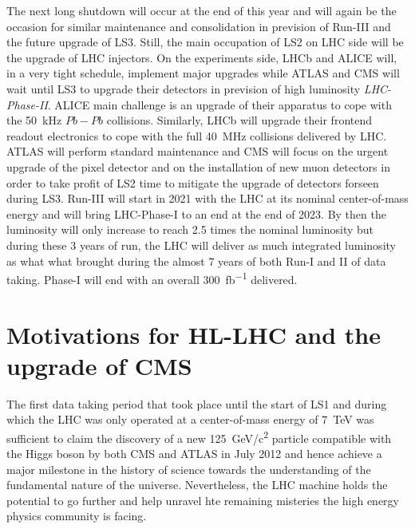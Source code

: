	The next long shutdown will occur at the end of this year and will again be the occasion for similar maintenance and consolidation in prevision of Run-III and the future upgrade of LS3. Still, the main occupation of LS2 on LHC side will be the upgrade of LHC injectors. On the experiments side, LHCb and ALICE will, in a very tight schedule, implement major upgrades while ATLAS and CMS will wait until LS3 to upgrade their detectors in prevision of high luminosity \textit{LHC-Phase-II}. ALICE main challenge is an upgrade of their apparatus to cope with the \SI{50}{kHz} $Pb-Pb$ collisions. Similarly, LHCb will upgrade their frontend readout electronics to cope with the full \SI{40}{MHz} collisions delivered by LHC. ATLAS will perform standard maintenance and CMS will focus on the urgent upgrade of the pixel detector and on the installation of new muon detectors in order to take profit of LS2 time to mitigate the upgrade of detectors forseen during LS3. Run-III will start in 2021 with the LHC at its nominal center-of-mass energy and will bring LHC-Phase-I to an end at the end of 2023. By then the luminosity will only increase to reach 2.5 times the nominal luminosity but during these 3 years of run, the LHC will deliver as much integrated luminosity as what what brought during the almost 7 years of both Run-I and II of data taking. Phase-I will end with an overall \SI{300}{fb^{-1}} delivered.\\
	
\section{Motivations for HL-LHC and the upgrade of CMS}
\label{chapt3:sec:motivations}

	The first data taking period that took place until the start of LS1 and during which the LHC was only operated at a center-of-mass energy of \SI{7}{TeV} was sufficient to claim the discovery of a new \SI{125}{GeV/c^2} particle compatible with the Higgs boson by both CMS and ATLAS in July 2012 and hence achieve a major milestone in the history of science towards the understanding of the fundamental nature of the universe. Nevertheless, the LHC machine holds the potential to go further and help unravel hte remaining misteries the high energy physics community is facing.
	
